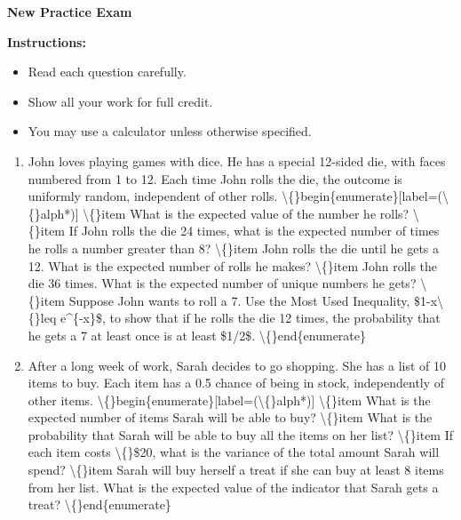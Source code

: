 \documentclass[11pt]{article}
\begin{document}
\begin{center}
\Large\textbf{New Practice Exam}
\end{center}

\vspace{0.5cm}

\textbf{Instructions:}
\begin{itemize}
\item Read each question carefully.
\item Show all your work for full credit.
\item You may use a calculator unless otherwise specified.
\end{itemize}

\vspace{0.5cm}

\begin{enumerate}[label=\textbf{Q\arabic*.}]
    \item [\textbackslash\{\}textbf\{Lucky Dice\}, 10 points] John loves playing games with dice. He has a special 12-sided die, with faces numbered from 1 to 12. Each time John rolls the die, the outcome is uniformly random, independent of other rolls.
 \textbackslash\{\}begin\{enumerate\}[label=(\textbackslash\{\}alph*)]
 \textbackslash\{\}item What is the expected value of the number he rolls?
 \textbackslash\{\}item If John rolls the die 24 times, what is the expected number of times he rolls a number greater than 8?
 \textbackslash\{\}item John rolls the die until he gets a 12. What is the expected number of rolls he makes?
 \textbackslash\{\}item John rolls the die 36 times. What is the expected number of unique numbers he gets?
 \textbackslash\{\}item Suppose John wants to roll a 7. Use the Most Used Inequality, \$1-x\textbackslash\{\}leq e\textasciicircum{}\{-x\}\$, to show that if he rolls the die 12 times, the probability that he gets a 7 at least once is at least \$1/2\$.
 \textbackslash\{\}end\{enumerate\}

    \item [\textbackslash\{\}textbf\{Random Shopping\}, 10 points] After a long week of work, Sarah decides to go shopping. She has a list of 10 items to buy. Each item has a 0.5 chance of being in stock, independently of other items.
 \textbackslash\{\}begin\{enumerate\}[label=(\textbackslash\{\}alph*)]
 \textbackslash\{\}item What is the expected number of items Sarah will be able to buy?
 \textbackslash\{\}item What is the probability that Sarah will be able to buy all the items on her list?
 \textbackslash\{\}item If each item costs \textbackslash\{\}\$20, what is the variance of the total amount Sarah will spend?
 \textbackslash\{\}item Sarah will buy herself a treat if she can buy at least 8 items from her list. What is the expected value of the indicator that Sarah gets a treat?
 \textbackslash\{\}end\{enumerate\}


\end{enumerate}
\end{document}
